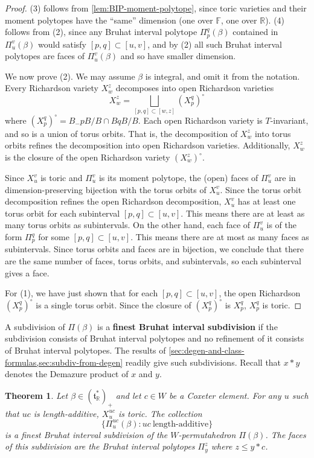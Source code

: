 \documentclass[11pt]{amsart}
\newtheorem{theorem}[Thm]{Theorem}
\theoremstyle{definition}
\newcommand{\RR}{\mathbb{R}}
\newcommand\defn[1]{{\bf #1}}
\def\pt{\beta}
\def\BB{{(\lie{t}_\RR^*)_+}}
\newcommand\lie[1]{{\mathfrak #1}}
\newcommand\FF{{\mathbb F}}
\begin{document}
\begin{proof}
  (3) follows from \cref{lem:BIP-moment-polytope}, since toric
  varieties and their moment polytopes have the ``same'' dimension
  (one over $\FF$, one over $\RR$). (4)
  follows from (2), since any Bruhat interval polytope $\Pi_p^q(\pt)$
  contained in $\Pi_u^v(\pt)$ would satisfy $[p, q] \subset [u,v]$,
  and by (2) all such Bruhat interval polytopes are faces of
  $\Pi_u^v(\pt)$ and so have smaller dimension.
	
	We now prove (2). We may assume $\pt$ is integral, and omit it from the notation. Every Richardson variety $X_w^z$ decomposes into open Richardson varieties
	\[X_w^z = \bigsqcup_{[p,q] \subset [w,z]} ({X}_p^q)^\circ\]
	where $({X}_p^q)^\circ = B_-p B/B \cap B q B /B$.
	Each open Richardson variety is $T$-invariant, and so is a union of torus orbits. That is, the decomposition of $X_w^z$ into torus orbits refines the decomposition into open Richardson varieties. Additionally, $X_w^z$ is the closure of the open Richardson variety $({X}_w^z)^\circ$.
	
	Since $X_u^v$ is toric and $\Pi_u^v$ is its moment polytope, the (open) faces of $\Pi_u^v$ are in dimension-preserving bijection with the torus orbits of $X_u^v$. Since the torus orbit decomposition refines the open Richardson decomposition, $X_u^v$ has at least one torus orbit for each subinterval $[p, q] \subset [u,v]$. This means there are at least as many torus orbits as subintervals. On the other hand, each face of $\Pi_u^v$ is of the form $\Pi_p^q$ for some $[p,q] \subset [u,v]$. This means there are at most as many faces as subintervals. Since torus orbits and faces are in bijection, we conclude that there are the same number of faces, torus orbits, and subintervals, so each subinterval gives a face.
	
	For (1), we have just shown that for each $[p,q] \subset [u,v]$, the open Richardson $(X_p^q)^\circ$ is a single torus orbit. Since the closure of $(X_p^q)^\circ$ is $X_p^q$, $X_p^q$ is toric.
\end{proof}

A subdivision of $\Pi(\pt)$ is a \defn{finest Bruhat interval subdivision} if the subdivision consists of Bruhat interval polytopes and no refinement of it consists of Bruhat interval polytopes. The results of \cref{sec:degen-and-class-formulas,sec:subdiv-from-degen} readily give such subdivisions. Recall that $x * y$ denotes the Demazure product of $x$ and $y$.

\begin{theorem}\label{thm:subdivision-Coxeter}
  Let $\pt \in \BB$ and let $c \in W$ be a Coxeter element. For any
  $u$ such that $uc$ is length-additive, $X_u^{uc}$ is toric. The
  collection \begin{equation}\label{eq:BIP-in-subdiv} \{\Pi_u^{uc}(\pt): uc~\text{length-additive}\} \end{equation} is a
  finest Bruhat interval subdivision of the $W$-permutahedron
  $\Pi(\pt)$. The faces of this subdivision are the Bruhat interval
  polytopes $\Pi_y^z$ where $z \leq y * c$.
\end{theorem}
\end{document}

